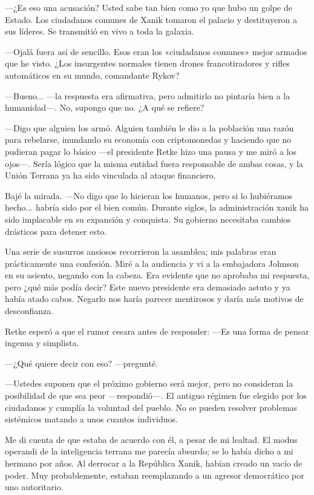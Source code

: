  —¿Es eso una acusación? Usted sabe tan bien como yo que hubo un golpe de Estado. Los ciudadanos comunes de Xanik tomaron el palacio y destituyeron a sus líderes. Se transmitió en vivo a toda la galaxia.

—Ojalá fuera así de sencillo. Esos eran los «ciudadanos comunes» mejor armados que he visto. ¿Los insurgentes normales tienen drones francotiradores y rifles automáticos en su mundo, comandante Rykov?

—Bueno... —la respuesta era afirmativa, pero admitirlo no pintaría bien a la humanidad—. No, supongo que no. ¿A qué se refiere?

—Digo que alguien los armó. Alguien también le dio a la población una razón para rebelarse, inundando su economía con criptomonedas y haciendo que no pudieran pagar lo básico —el presidente Retke hizo una pausa y me miró a los ojos—. Sería lógico que la misma entidad fuera responsable de ambas cosas, y la Unión Terrana ya ha sido vinculada al ataque financiero.

Bajé la mirada. —No digo que lo hicieran los humanos, pero si lo hubiéramos hecho... habría sido por el bien común. Durante siglos, la administración xanik ha sido implacable en su expansión y conquista. Su gobierno necesitaba cambios drásticos para detener esto.

Una serie de susurros ansiosos recorrieron la asamblea; mis palabras eran prácticamente una confesión. Miré a la audiencia y vi a la embajadora Johnson en su asiento, negando con la cabeza. Era evidente que no aprobaba mi respuesta, pero ¿qué más podía decir? Este nuevo presidente era demasiado astuto y ya había atado cabos. Negarlo nos haría parecer mentirosos y daría más motivos de desconfianza.

Retke esperó a que el rumor cesara antes de responder: —Es una forma de pensar ingenua y simplista.

 —¿Qué quiere decir con eso? —pregunté.

—Ustedes suponen que el próximo gobierno será mejor, pero no consideran la posibilidad de que sea peor —respondió—. El antiguo régimen fue elegido por los ciudadanos y cumplía la voluntad del pueblo. No se pueden resolver problemas sistémicos matando a unos cuantos individuos.

Me di cuenta de que estaba de acuerdo con él, a pesar de mi lealtad. El modus operandi de la inteligencia terrana me parecía absurdo; se lo había dicho a mi hermano por años. Al derrocar a la República Xanik, habían creado un vacío de poder. Muy probablemente, estaban reemplazando a un agresor democrático por uno autoritario.

